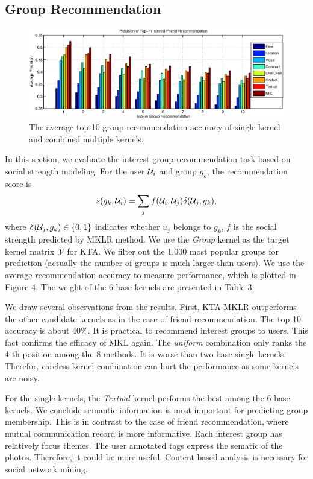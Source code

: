 \subsection{Group Recommendation}

\begin{figure}[!ht]
\includegraphics[width=\linewidth]{figures/group.eps}
\caption{The average top-10 group recommendation accuracy of single kernel and combined multiple kernels.}
\end{figure}

In this section, we evaluate the interest group recommendation task based on social strength modeling. For the user ${\cal U}_i$ and group $g_k$, the recommendation
score is
\[
s(g_k, {\cal U}_i) = \sum_jf({\cal U}_i, {\cal U}_j)\delta({\cal U}_j, g_k),
\]
where $\delta({\cal U}_j, g_k)\in\{0, 1\}$ indicates whether $u_j$ belongs to $g_k$, $f$ is the social strength predicted by MKLR method. We use the {\em Group}
kernel as the target kernel matrix ${\cal Y}$ for KTA. We filter out the 1,000 most popular groups for prediction (actually the number of groups is much larger than users). We use the average recommendation accuracy to measure performance, which is plotted in Figure 4. The weight of the 6 base kernels are presented in Table 3.

We draw several observations from the results. First, KTA-MKLR outperforms the other candidate kernels as in the case of friend recommendation. The top-10 accuracy is about 40\%. It is practical to recommend interest groups to users. This fact confirms the efficacy of MKL again. The {\em uniform} combination only ranks the 4-th position among the 8 methods. It is worse than two base single kernels. Therefor, careless kernel combination can hurt the performance as some kernels are noisy.

For the single kernels, the {\em Textual} kernel performs the best among the 6 base kernels. We conclude semantic information is most important for predicting group membership. This is in contrast to the case of friend recommendation, where mutual communication record is more informative. Each interest group has relatively focus themes. The user annotated tags express the sematic of the photos. Therefore, it could be more useful. Content based analysis is necessary for social network mining.

